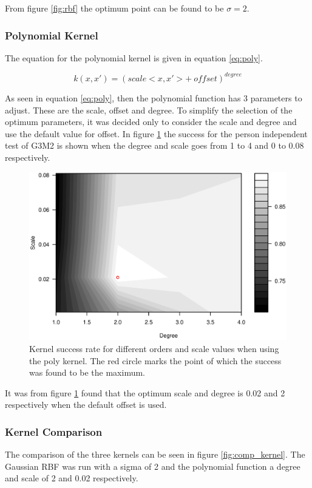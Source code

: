 From figure \ref{fig:rbf} the optimum point can be found to be $\sigma = 2$.

\subsubsection{Polynomial Kernel}
The equation for the polynomial kernel is given in equation \ref{eq:poly}.

\begin{equation}
k(x,x') = (scale <x, x'> +\ offset)^{degree}
\label{eq:poly}
\end{equation}

As seen in equation \ref{eq:poly}, then the polynomial function has 3 parameters to adjust.
These are the scale, offset and degree.
To simplify the selection of the optimum parameters, it was decided only to consider the scale and degree and use the default value for offset.
In figure \ref{fig:poly} the success for the person independent test of G3M2 is shown when the degree and scale goes from 1 to 4 and 0 to 0.08 respectively.

\begin{figure}[H]
\centering
\includegraphics[width = 0.9 \textwidth]{graphics/contour_svm_poly}
\caption{Kernel success rate for different orders and scale values when using the poly kernel.
The red circle marks the point of which the success was found to be the maximum.}
\label{fig:poly}
\end{figure}

It was from figure \ref{fig:poly} found that the optimum scale and degree is 0.02 and 2 respectively when the default offset is used.


\subsubsection{Kernel Comparison}
The comparison of the three kernels can be seen in figure \ref{fig:comp_kernel}.
The Gaussian RBF was run with a sigma of 2 and the polynomial function a degree and scale of 2 and 0.02 respectively.


